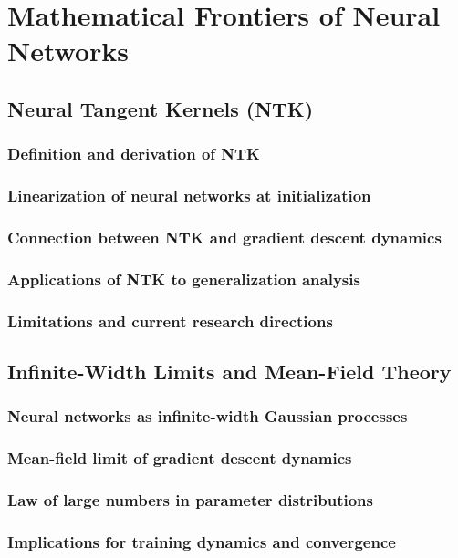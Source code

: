 ﻿\chapter{Mathematical Frontiers of Neural Networks}
\section{Neural Tangent Kernels (NTK)}
\subsection{Definition and derivation of NTK}
\subsection{Linearization of neural networks at initialization}
\subsection{Connection between NTK and gradient descent dynamics}
\subsection{Applications of NTK to generalization analysis}
\subsection{Limitations and current research directions}

\section{Infinite-Width Limits and Mean-Field Theory}
\subsection{Neural networks as infinite-width Gaussian processes}
\subsection{Mean-field limit of gradient descent dynamics}
\subsection{Law of large numbers in parameter distributions}
\subsection{Implications for training dynamics and convergence}
